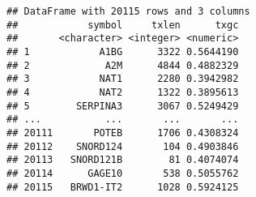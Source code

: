 \documentclass[]{article}
\begin{document}
\begin{verbatim}
## DataFrame with 20115 rows and 3 columns
##            symbol     txlen      txgc
##       <character> <integer> <numeric>
## 1            A1BG      3322 0.5644190
## 2             A2M      4844 0.4882329
## 3            NAT1      2280 0.3942982
## 4            NAT2      1322 0.3895613
## 5        SERPINA3      3067 0.5249429
## ...           ...       ...       ...
## 20111       POTEB      1706 0.4308324
## 20112    SNORD124       104 0.4903846
## 20113   SNORD121B        81 0.4074074
## 20114      GAGE10       538 0.5055762
## 20115   BRWD1-IT2      1028 0.5924125
\end{verbatim}
\end{document}
